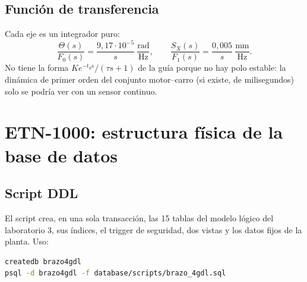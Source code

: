 \documentclass[a4paper,11pt]{article}
\begin{document}
\subsection{Función de transferencia}
Cada eje es un integrador puro:
\[
\frac{\Theta(s)}{F_0(s)} = \frac{9{,}17\cdot10^{-5}}{s}~\frac{\text{rad}}{\text{Hz}}, \qquad \frac{S_X(s)}{F_1(s)} = \frac{0{,}005}{s}~\frac{\text{mm}}{\text{Hz}} .
\]
No tiene la forma $Ke^{-t_ds}/(\tau s + 1)$ de la guía porque no hay polo estable: la dinámica de primer orden del conjunto motor--carro (si existe, de milisegundos) solo se podría ver con un sensor continuo.


\section{ETN-1000: estructura física de la base de datos}
\subsection{Script DDL}
El script  crea, en una sola transacción, las 15 tablas del modelo lógico del laboratorio 3, sus índices, el trigger de seguridad, dos vistas y los datos fijos de la planta. Uso:
\begin{lstlisting}[language=bash]
createdb brazo4gdl
psql -d brazo4gdl -f database/scripts/brazo_4gdl.sql
\end{lstlisting}
\end{document}
